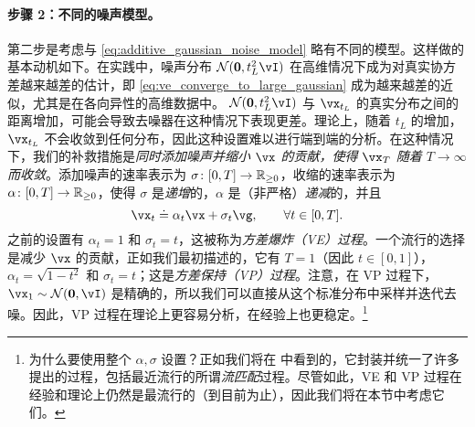 \documentclass[../../book-main_zh.tex]{subfiles}
\begin{document}
\paragraph{步骤 2：不同的噪声模型。} 第二步是考虑与 \eqref{eq:additive_gaussian_noise_model} 略有不同的模型。这样做的基本动机如下。在实践中，噪声分布 \(\dNorm(\vzero, t_{L}^{2}\vI)\) 在高维情况下成为对真实协方差越来越差的估计，即 \eqref{eq:ve_converge_to_large_gaussian} 成为越来越差的近似，尤其是在各向异性的高维数据中。 \(\dNorm(\vzero, t_{L}^{2}\vI)\) 与 \(\vx_{t_{L}}\) 的真实分布之间的距离增加，可能会导致去噪器在这种情况下表现更差。理论上，随着 \(t_{L}\) 的增加，\(\vx_{t_{L}}\) 不会收敛到任何分布，因此这种设置难以进行端到端的分析。在这种情况下，我们的补救措施是\textit{同时添加噪声并缩小 \(\vx\) 的贡献，使得 \(\vx_{T}\) 随着 \(T \to \infty\) 而收敛}。添加噪声的速率表示为 \(\sigma \colon [0, T] \to \mathbb{R}_{\geq 0}\)，收缩的速率表示为 \(\alpha \colon [0, T] \to \mathbb{R}_{\geq 0}\)，使得 \(\sigma\) 是\textit{递增}的，\(\alpha\) 是（非严格）\textit{递减}的，并且
\begin{equation}\label{eq:gen_additive_gaussian_noise_model}
	\vx_{t} \doteq \alpha_{t}\vx + \sigma_{t}\vg, \qquad \forall t \in [0, T].
\end{equation}
之前的设置有 \(\alpha_{t} = 1\) 和 \(\sigma_{t} = t\)，这被称为\textit{方差爆炸（VE）过程}。一个流行的选择是减少 \(\vx\) 的贡献，正如我们最初描述的，它有 \(T = 1\)（因此 \(t \in [0, 1]\)），\(\alpha_{t} = \sqrt{1 - t^{2}}\) 和 \(\sigma_{t} = t\)；这是\textit{方差保持（VP）过程}。注意，在 VP 过程下，\(\vx_{1} \sim \dNorm(\vzero, \vI)\) 是精确的，所以我们可以直接从这个标准分布中采样并迭代去噪。因此，VP 过程在理论上更容易分析，在经验上也更稳定。\footnote{为什么要使用整个 \(\alpha, \sigma\) 设置？正如我们将在  中看到的，它封装并统一了许多提出的过程，包括最近流行的所谓\textit{流匹配}过程。尽管如此，VE 和 VP 过程在经验和理论上仍然是最流行的（到目前为止），因此我们将在本节中考虑它们。}
\end{document}
